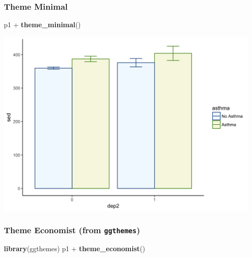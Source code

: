 \documentclass[]{tufte-book}
\newenvironment{Shaded}{}{}
\newcommand{\KeywordTok}[1]{\textcolor[rgb]{0.00,0.44,0.13}{\textbf{#1}}}
\newcommand{\StringTok}[1]{\textcolor[rgb]{0.25,0.44,0.63}{#1}}
\newcommand{\OperatorTok}[1]{\textcolor[rgb]{0.40,0.40,0.40}{#1}}
\newcommand{\NormalTok}[1]{#1}
\theoremstyle{definition}
\theoremstyle{definition}
\theoremstyle{remark}
\begin{document}
\subsubsection*{Theme Minimal}\label{theme-minimal}

\begin{Shaded}
\begin{Highlighting}[]
\NormalTok{p1 }\OperatorTok{+}\StringTok{ }\KeywordTok{theme_minimal}\NormalTok{()}
\end{Highlighting}
\end{Shaded}

\includegraphics{_main_files/figure-latex/unnamed-chunk-148-1}

\subsubsection*{\texorpdfstring{Theme Economist (from
\texttt{ggthemes})}{Theme Economist (from ggthemes)}}\label{theme-economist-from-ggthemes}

\begin{Shaded}
\begin{Highlighting}[]
\KeywordTok{library}\NormalTok{(ggthemes)}
\NormalTok{p1 }\OperatorTok{+}\StringTok{ }\KeywordTok{theme_economist}\NormalTok{()}
\end{Highlighting}
\end{Shaded}
\end{document}
